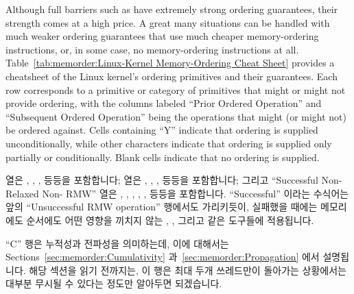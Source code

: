 Although full barriers such as  have extremely strong
ordering guarantees, their strength comes at a high price.
A great many situations can be handled with much weaker ordering guarantees
that use much cheaper memory-ordering instructions, or, in some case, no
memory-ordering instructions at all.
Table~\ref{tab:memorder:Linux-Kernel Memory-Ordering Cheat Sheet}
provides a cheatsheet of the Linux kernel's ordering primitives and their
guarantees.
Each row corresponds to a primitive or category of primitives that might
or might not provide ordering, with the columns labeled
``Prior Ordered Operation'' and ``Subsequent Ordered Operation''
being the operations that might (or might not) be ordered against.
Cells containing ``Y'' indicate that ordering is supplied unconditionally,
while other characters indicate that ordering is supplied only partially or
conditionally.
Blank cells indicate that no ordering is supplied.
\fi

 열은 , ,
, 등등을 포함합니다;
 열은 , ,
, 등등을 포함합니다; 그리고
``Successful Non-Relaxed Non- RMW'' 열은 ,
, , ,
, 등등을 포함합니다.
``Successful'' 이라는 수식어는 앞의 ``Unsuccessful RMW operation'' 행에서도
가리키듯이, 실패했을 때에는 메모리에도 순서에도 어떤 영향을 끼치지 않는
, , 그리고 
같은 도구들에 적용됩니다.

``C'' 행은 누적성과 전파성을 의미하는데, 이에 대해서는
Sections~\ref{sec:memorder:Cumulativity}
과~\ref{sec:memorder:Propagation} 에서 설명됩니다.
해당 섹션을 읽기 전까지는, 이 행은 최대 두개 쓰레드만이 돌아가는 상황에서는
대부분 무시될 수 있다는 정도만 알아두면 되겠습니다.
\iffalse

